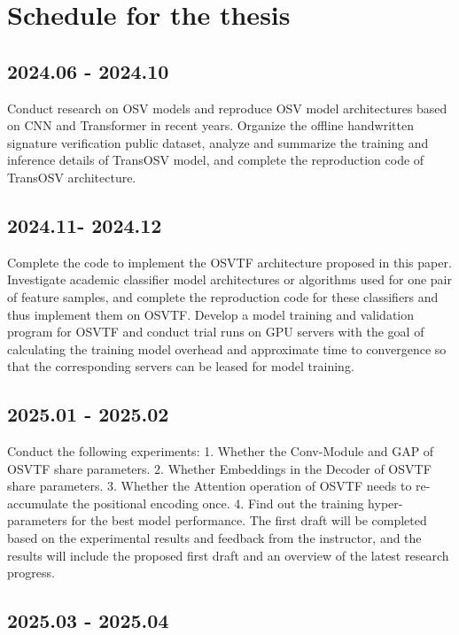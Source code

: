 \documentclass{article}
\begin{document}
\newpage
\section{Schedule for the thesis}

\subsection*{2024.06 - 2024.10}

Conduct research on OSV models and reproduce OSV model architectures based on CNN and Transformer in recent years. Organize the offline handwritten signature verification public dataset, analyze and summarize the training and inference details of TransOSV model, and complete the reproduction code of TransOSV architecture.

\subsection*{2024.11- 2024.12}

Complete the code to implement the OSVTF architecture proposed in this paper. Investigate academic classifier model architectures or algorithms used for one pair of feature samples, and complete the reproduction code for these classifiers and thus implement them on OSVTF. Develop a model training and validation program for OSVTF and conduct trial runs on GPU servers with the goal of calculating the training model overhead and approximate time to convergence so that the corresponding servers can be leased for model training.

\subsection*{2025.01 - 2025.02}

Conduct the following experiments: 1. Whether the Conv-Module and GAP of OSVTF share parameters. 2. Whether Embeddings in the Decoder of OSVTF share parameters. 3. Whether the Attention operation of OSVTF needs to re-accumulate the positional encoding once. 4. Find out the training hyper-parameters for the best model performance. The first draft will be completed based on the experimental results and feedback from the instructor, and the results will include the proposed first draft and an overview of the latest research progress.

\subsection*{2025.03 - 2025.04}
\end{document}
